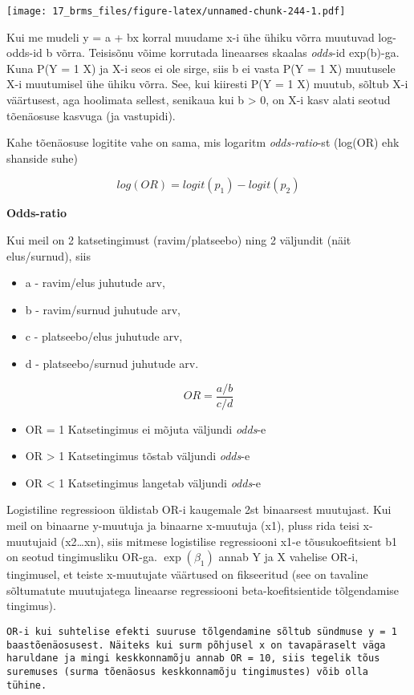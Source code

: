 \documentclass[]{article}
\begin{document}
\texttt{[image: 17\_brms\_files/figure-latex/unnamed-chunk-244-1.pdf]}

Kui me mudeli y = a + bx korral muudame x-i ühe ühiku võrra muutuvad
log-odds-id b võrra. Teisisõnu võime korrutada lineaarses skaalas
\emph{odds}-id exp(b)-ga. Kuna P(Y = 1 \textbar{} X) ja X-i seos ei ole
sirge, siis b ei vasta P(Y = 1 \textbar{} X) muutusele X-i muutumisel
ühe ühiku võrra. See, kui kiiresti P(Y = 1 \textbar{} X) muutub, sõltub
X-i väärtusest, aga hoolimata sellest, senikaua kui b \textgreater{} 0,
on X-i kasv alati seotud tõenäosuse kasvuga (ja vastupidi).

Kahe tõenäosuse logitite vahe on sama, mis logaritm \emph{odds-ratio}-st
(log(OR) ehk shanside suhe)

\[{log} (OR)= {logit} (p_{1})- {logit} (p_{2})\]

\textbf{Odds-ratio}

Kui meil on 2 katsetingimust (ravim/platseebo) ning 2 väljundit (näit
elus/surnud), siis

\begin{itemize}
\item
  a - ravim/elus juhutude arv,
\item
  b - ravim/surnud juhutude arv,
\item
  c - platseebo/elus juhutude arv,
\item
  d - platseebo/surnud juhutude arv.
\end{itemize}

\[OR = \frac {a/b}{c/d}\]

\begin{itemize}
\item
  OR = 1 Katsetingimus ei mõjuta väljundi \emph{odds}-e
\item
  OR \textgreater{} 1 Katsetingimus tõstab väljundi \emph{odds}-e
\item
  OR \textless{} 1 Katsetingimus langetab väljundi \emph{odds}-e
\end{itemize}

Logistiline regressioon üldistab OR-i kaugemale 2st binaarsest
muutujast. Kui meil on binaarne y-muutuja ja binaarne x-muutuja (x1),
pluss rida teisi x-muutujaid (x2\ldots{}xn), siis mitmese logistilise
regressiooni x1-e tõusukoefitsient b1 on seotud tingimusliku OR-ga.
\(\exp(\beta_1)\) annab Y ja X vahelise OR-i, tingimusel, et teiste
x-muutujate väärtused on fikseeritud (see on tavaline sõltumatute
muutujatega lineaarse regressiooni beta-koefitsientide tõlgendamise
tingimus).

\begin{verbatim}
OR-i kui suhtelise efekti suuruse tõlgendamine sõltub sündmuse y = 1 
baastõenäosusest. Näiteks kui surm põhjusel x on tavapäraselt väga 
haruldane ja mingi keskkonnamõju annab OR = 10, siis tegelik tõus 
suremuses (surma tõenäosus keskkonnamõju tingimustes) võib olla tühine. 
\end{verbatim}
\end{document}
